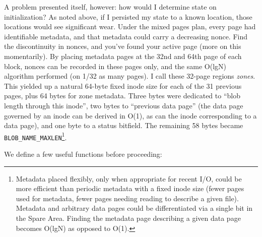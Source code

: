 \documentclass[letterpaper,10pt]{article}
\begin{document}
A problem presented itself, however: how would I determine state on
initialization? As noted above, if I persisted my state
to a known location, those locations would see significant wear. Under the
mixed pages plan, every page had identifiable metadata, and that metadata could
carry a decreasing nonce. Find the discontinuity in nonces, and you've found
your active page (more on this momentarily). By placing metadata pages at the
32nd and 64th page of each block, nonces can be recorded in these pages only, and
the same O(lgN) algorithm performed (on 1/32 as many pages). I call these
32-page regions \textit{zones}. This yielded up a natural 64-byte fixed inode
size for each of the 31 previous pages, plus 64 bytes for zone metadata. Three
bytes were dedicated to ``blob length through this inode'', two bytes to
``previous data page'' (the data page governed by an inode can be derived in
O(1), as can the inode corresponding to a data
page), and one byte to a status bitfield. The remaining 58 bytes became
\texttt{BLOB\_NAME\_MAXLEN}\footnote{Metadata placed flexibly, only when
  appropriate for recent I/O, could be more efficient than periodic metadata
  with a fixed inode size (fewer pages used for metadata, fewer pages needing
  reading to describe a given file). Metadata and arbitrary data pages could be
  differentiated via a single bit in the Spare Area. Finding the metadata page
  describing a given data page becomes O(lgN) as opposed to O(1).}.

We define a few useful functions before proceeding:
\end{document}
